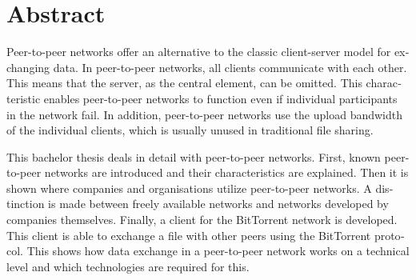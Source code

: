 \chapter{Abstract}


\begin{english} %
Peer-to-peer networks offer an alternative to the classic client-server model for exchanging data. In peer-to-peer networks, all clients communicate with each other. This means that the server, as the central element, can be omitted. This characteristic enables peer-to-peer networks to function even if individual participants in the network fail. In addition, peer-to-peer networks use the upload bandwidth of the individual clients, which is usually unused in traditional file sharing. 

This bachelor thesis deals in detail with peer-to-peer networks. First, known peer-to-peer networks are introduced and their characteristics are explained. Then it is shown where companies and organisations utilize peer-to-peer networks. A distinction is made between freely available networks and networks developed by companies themselves. Finally, a client for the BitTorrent network is developed. This client is able to exchange a file with other peers using the BitTorrent protocol. This shows how data exchange in a peer-to-peer network works on a technical level and which technologies are required for this.
\end{english}


